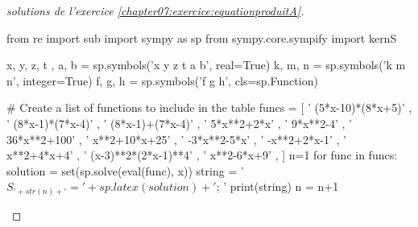 \documentclass[main.tex]{subfiles}
\begin{document}
\begin{proof}[solutions de l'exercice \ref{chapter07:exercice:equationproduitA}]  
	 \scriptsize  
\begin{pycode}
from re import sub
import sympy as sp
from sympy.core.sympify import kernS

x, y, z, t , a, b = sp.symbols('x y z t a b', real=True)
k, m, n = sp.symbols('k m n', integer=True)
f, g, h = sp.symbols('f g h', cls=sp.Function)

# Create a list of functions to include in the table
funcs = [
' (5*x-10)*(8*x+5)' ,
' (8*x-1)*(7*x-4)' ,
' (8*x-1)+(7*x-4)' ,
' 5*x**2+2*x' ,
'  9*x**2-4' ,
' 36*x**2+100' ,
' x**2+10*x+25' ,
' -3*x**2-5*x' ,
' -x**2+2*x-1' ,
' x**2+4*x+4' ,
' (x-3)**2*(2*x-1)**4' ,
' x**2-6*x+9' ,
]
n=1 
for func in funcs: 
	solution = set(sp.solve(eval(func), x))
	string =  '$S_{'+str(n)+'}='+   sp.latex(solution ) + '$; '
	print(string) 
	n = n+1
\end{pycode}   
\end{proof}
\end{document}
